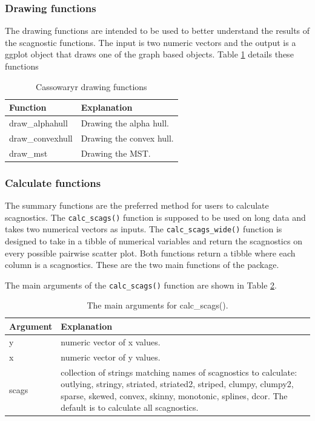 \hypertarget{drawing-functions}{%
\subsubsection{Drawing functions}\label{drawing-functions}}

The drawing functions are intended to be used to better understand the results of the scagnostic functions. The input is two numeric vectors and the output is a ggplot object that draws one of the graph based objects. Table \ref{tab:drawfuncs-tb-pdf} details these functions

\begin{table}

\caption{\label{tab:drawfuncs-tb-pdf}Cassowaryr drawing functions}
\centering
\begin{tabular}[t]{>{\raggedright\arraybackslash}p{3cm}l}
\toprule
Function & Explanation\\
\midrule
draw\_alphahull & Drawing the alpha hull.\\
draw\_convexhull & Drawing the convex hull.\\
draw\_mst & Drawing the MST.\\
\bottomrule
\end{tabular}
\end{table}

\hypertarget{calculate-functions}{%
\subsubsection{Calculate functions}\label{calculate-functions}}

The summary functions are the preferred method for users to calculate scagnostics. The \texttt{calc\_scags()} function is supposed to be used on long data and takes two numerical vectors as inputs. The \texttt{calc\_scags\_wide()} function is designed to take in a tibble of numerical variables and return the scagnostics on every possible pairwise scatter plot. Both functions return a tibble where each column is a scagnostics. These are the two main functions of the package.

The main arguments of the \texttt{calc\_scags()} function are shown in Table \ref{tab:calcfunc-tb-pdf}.

\begin{table}

\caption{\label{tab:calcfunc-tb-pdf}The main arguments for calc\_scags().}
\centering
\begin{tabular}[t]{l>{\raggedright\arraybackslash}p{12cm}}
\toprule
Argument & Explanation\\
\midrule
y & numeric vector of x values.\\
x & numeric vector of y values.\\
scags & collection of strings matching names of scagnostics to calculate: outlying, stringy, striated, striated2, striped, clumpy, clumpy2, sparse, skewed, convex, skinny, monotonic, splines, dcor. The default is to calculate all scagnostics.\\
\bottomrule
\end{tabular}
\end{table}

